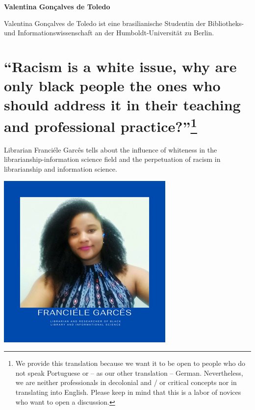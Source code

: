 \documentclass[a4paper,
fontsize=11pt,
oneside,
numbers=noperiodatend,
parskip=half-,
bibliography=totoc,
final
]{scrartcl}
\begin{document}
\textbf{Valentina Gonçalves de Toledo}

Valentina Gonçalves de Toledo ist eine brasilianische Studentin der
Bibliotheks- und Informationswissenschaft an der Humboldt-Universität zu
Berlin.

\pagebreak

\hypertarget{racism-is-a-white-issue-why-are-only-black-people-the-ones-who-should-address-it-in-their-teaching-and-professional-practice15}{%
\section[\enquote{Racism is a white issue, why are only black people
the ones who should address it in their teaching and professional
practice?}]{\texorpdfstring{\enquote{Racism is a white issue, why are
only black people the ones who should address it in their teaching and
professional
practice?}\footnote{We provide this translation because we want it to be
  open to people who do not speak Portuguese or -- as our other
  translation -- German. Nevertheless, we are neither professionals in
  decolonial and / or critical concepts nor in translating into English.
  Please keep in mind that this is a labor of novices who want to open a
  discussion.}}{``Racism is a white issue, why are only black people the ones who should address it in their teaching and professional practice?''}}\label{racism-is-a-white-issue-why-are-only-black-people-the-ones-who-should-address-it-in-their-teaching-and-professional-practice15}}

Librarian Franciéle Garcês tells about the influence of
whiteness in the librarianship-information science field and the
perpetuation of racism in librarianship and information
science.

\begin{center}
\includegraphics{img/img1.PNG}
\end{center}
\end{document}
